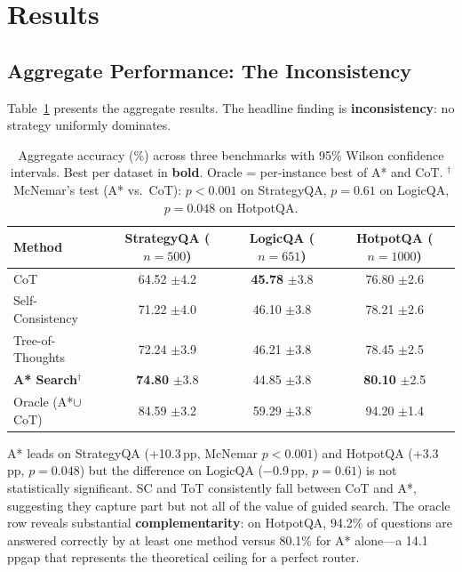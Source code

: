 \documentclass[11pt]{article}
\newcommand{\pp}{\,pp}
\begin{document}
\section{Results}
\label{sec:results}

\subsection{Aggregate Performance: The Inconsistency}
\label{sec:aggregate}

Table~\ref{tab:aggregate} presents the aggregate results. The headline finding is \textbf{inconsistency}: no strategy uniformly dominates.

\begin{table}[t]
\centering
\caption{Aggregate accuracy (\%) across three benchmarks with 95\% Wilson confidence intervals. Best per dataset in \textbf{bold}. Oracle = per-instance best of A* and CoT. $^\dagger$McNemar's test (A* vs.\ CoT): $p < 0.001$ on StrategyQA, $p = 0.61$ on LogicQA, $p = 0.048$ on HotpotQA.}
\label{tab:aggregate}
\small
\begin{tabular}{@{}lccc@{}}
\toprule
\textbf{Method} & \textbf{StrategyQA} ($n{=}500$) & \textbf{LogicQA} ($n{=}651$) & \textbf{HotpotQA} ($n{=}1000$) \\
\midrule
CoT & 64.52 {\scriptsize$\pm$4.2} & \textbf{45.78} {\scriptsize$\pm$3.8} & 76.80 {\scriptsize$\pm$2.6} \\
Self-Consistency & 71.22 {\scriptsize$\pm$4.0} & 46.10 {\scriptsize$\pm$3.8} & 78.21 {\scriptsize$\pm$2.6} \\
Tree-of-Thoughts & 72.24 {\scriptsize$\pm$3.9} & 46.21 {\scriptsize$\pm$3.8} & 78.45 {\scriptsize$\pm$2.5} \\
\textbf{A* Search}$^\dagger$ & \textbf{74.80} {\scriptsize$\pm$3.8} & 44.85 {\scriptsize$\pm$3.8} & \textbf{80.10} {\scriptsize$\pm$2.5} \\
\midrule
Oracle (A*$\cup$CoT) & 84.59 {\scriptsize$\pm$3.2} & 59.29 {\scriptsize$\pm$3.8} & 94.20 {\scriptsize$\pm$1.4} \\
\bottomrule
\end{tabular}
\end{table}

A* leads on StrategyQA (+10.3\pp, McNemar $p < 0.001$) and HotpotQA (+3.3\pp, $p = 0.048$) but the difference on LogicQA ($-$0.9\pp, $p = 0.61$) is not statistically significant. SC and ToT consistently fall between CoT and A*, suggesting they capture part but not all of the value of guided search. The oracle row reveals substantial \textbf{complementarity}: on HotpotQA, 94.2\% of questions are answered correctly by at least one method versus 80.1\% for A* alone---a 14.1\pp gap that represents the theoretical ceiling for a perfect router.
\end{document}
